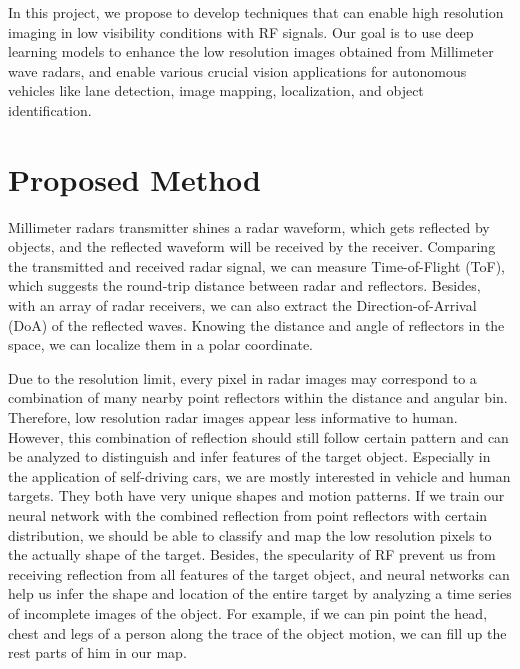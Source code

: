 \documentclass[10pt,twocolumn,letterpaper]{article}
\begin{document}
In this project, we propose to develop techniques that can enable high resolution imaging in low visibility conditions with RF signals. Our goal is to use deep learning models to enhance the low resolution images obtained from Millimeter wave radars, and enable various crucial vision applications for autonomous vehicles like lane detection, image mapping, localization, and object identification.



\section{Proposed Method}
Millimeter radars transmitter shines a radar waveform, which gets reflected by objects, and the reflected waveform will be received by the receiver. Comparing the transmitted and received radar signal, we can measure Time-of-Flight (ToF), which suggests the round-trip distance between radar and reflectors. Besides, with an array of radar receivers, we can also extract the Direction-of-Arrival (DoA) of the reflected waves. Knowing the distance and angle of reflectors in the space, we can localize them in a polar coordinate. 

\par Due to the resolution limit, every pixel in radar images may correspond to a combination of many nearby point reflectors within the distance and angular bin. Therefore, low resolution radar images appear less informative to human. However, this combination of reflection should still follow certain pattern and can be analyzed to distinguish and infer features of the target object. Especially in the application of self-driving cars, we are mostly interested in vehicle and human targets. They both have very unique shapes and motion patterns. If we train our neural network with the combined reflection from point reflectors with certain distribution, we should be able to classify and map the low resolution pixels to the actually shape of the target. Besides, the specularity of RF prevent us from receiving reflection from all features of the target object, and neural networks can help us infer the shape and location of the entire target by analyzing a time series of incomplete images of the object. For example, if we can pin point the head, chest and legs of a person along the trace of the object motion, we can fill up the rest parts of him in our map. 
 
\end{document}
